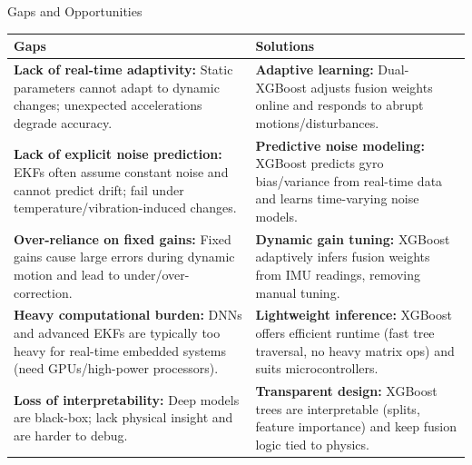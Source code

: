 \documentclass[aspectratio=169,xcolor=dvipsnames]{beamer}
\begin{document}

\begin{frame}{Gaps and Opportunities}
\scriptsize
\renewcommand{\arraystretch}{1.05}

\begin{tabular}{p{} p{}}
\textbf{Gaps} & \textbf{Solutions} \\
\hline

\textbf{Lack of real-time adaptivity:} Static parameters cannot adapt to dynamic changes; unexpected accelerations degrade accuracy.
&
\textbf{Adaptive learning:} Dual-XGBoost adjusts fusion weights online and responds to abrupt motions/disturbances.
\\ \hline

\textbf{Lack of explicit noise prediction:} EKFs often assume constant noise and cannot predict drift; fail under temperature/vibration-induced changes.
&
\textbf{Predictive noise modeling:} XGBoost predicts gyro bias/variance from real-time data and learns time-varying noise models.
\\ \hline

\textbf{Over-reliance on fixed gains:} Fixed gains cause large errors during dynamic motion and lead to under/over-correction.
&
\textbf{Dynamic gain tuning:} XGBoost adaptively infers fusion weights from IMU readings, removing manual tuning.
\\ \hline

\textbf{Heavy computational burden:} DNNs and advanced EKFs are typically too heavy for real-time embedded systems (need GPUs/high-power processors).
&
\textbf{Lightweight inference:} XGBoost offers efficient runtime (fast tree traversal, no heavy matrix ops) and suits microcontrollers.
\\ \hline

\textbf{Loss of interpretability:} Deep models are black-box; lack physical insight and are harder to debug.
&
\textbf{Transparent design:} XGBoost trees are interpretable (splits, feature importance) and keep fusion logic tied to physics.
\\ \hline
\end{tabular}

\end{frame}
\end{document}

